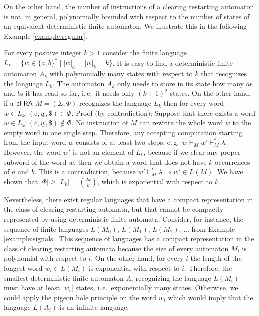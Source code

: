 On the other hand, the number of instructions of a clearing restarting automaton is not, in general, polynomially bounded with respect to the number of states of an equivalent deterministic finite automaton. We illustrate this in the following Example \ref{example:regular}.

\begin{example}\label{example:regular}
For every positive integer $k > 1$ consider the finite language $L_k = \{ w \in \{a, b\}^* \mid |w|_a = |w|_b = k \}$. It is easy to find a deterministic finite automaton $A_k$ with polynomially many states with respect to $k$ that recognizes the language $L_k$. The automaton $A_k$ only needs to store in its state how many $a$s and $b$s it has read so far, i.\,e.\ it needs only $(k+1)^2$ states. On the other hand, if a $\textup{\sf cl-RA\/}$ $M = (\Sigma, \Phi)$ recognizes the language $L_k$ then for every word $w \in L_k: (\cent, \underline{w}, \$) \in \Phi$. Proof (by contradiction): Suppose that there exists a word $w \in L_k: (\cent, \underline{w}, \$) \notin \Phi$. No instruction of $M$ can rewrite the whole word $w$ to the empty word in one single step. Therefore, any accepting computation starting from the input word $w$ consists of at least two steps, e.\,g.\ $w \vdash_M w' \vdash_M^* \lambda$.  However, the word $w'$ is not an element of $L_k$, because if we clear any proper subword of the word $w$, then we obtain a word that does not have $k$ occurrences of $a$ and $b$. This is a contradiction, because $w' \vdash_M^* \lambda \Rightarrow w' \in L(M)$. We have shown that $|\Phi| \ge |L_k| = \binom{2k}{k}$, which is exponential with respect to $k$.
\end{example}

Nevertheless, there exist regular languages that have a compact representation in the class of clearing restarting automata, but that cannot be compactly represented by using deterministic finite automata. Consider, for instance, the sequence of finite languages $L(M_0)$, $L(M_1)$, $L(M_2)$, $\ldots$ from Example \ref{example:signals}. This sequence of languages has a compact representation in the class of clearing restarting automata because the size of every automaton $M_i$ is polynomial with respect to $i$. On the other hand, for every $i$ the length of the longest word $w_i \in L(M_i)$ is exponential with respect to $i$. Therefore, the smallest deterministic finite automaton $A_i$ recognizing the language $L(M_i)$ must have at least $|w_i|$ states, i.\,e.\ exponentially many states. Otherwise, we could apply the pigeon hole principle on the word $w_i$ which would imply that the language $L(A_i)$ is an infinite language.

